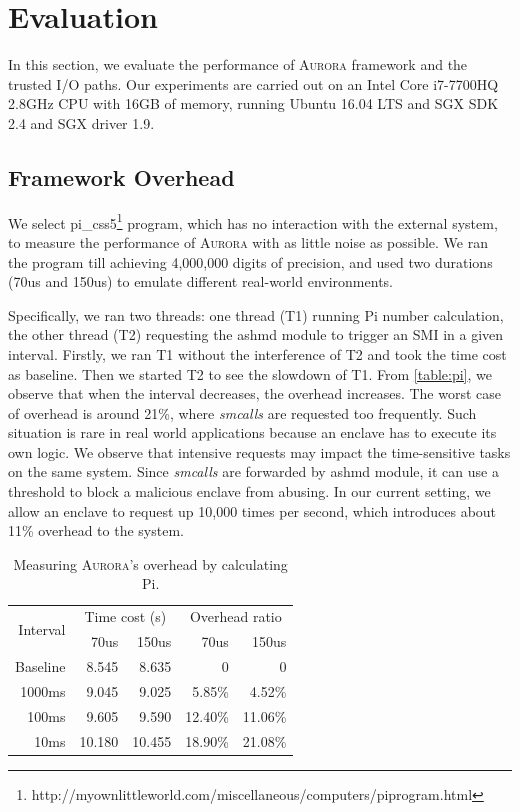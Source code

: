 \section{Evaluation}\label{performance}

In this section, we evaluate the performance of \textsc{Aurora} framework and the trusted I/O paths. Our experiments are carried out on  an Intel Core i7-7700HQ 2.8GHz CPU with 16GB of memory, running Ubuntu 16.04 LTS and SGX SDK 2.4 and SGX driver 1.9.

\subsection{Framework Overhead}
We select  pi\_css5\footnote{http://myownlittleworld.com/miscellaneous/computers/piprogram.html} program, which has no interaction with the external system, to measure the performance of \textsc{Aurora} with as little noise as possible. We ran the program till achieving 4,000,000 digits of precision, and used two durations (70us and 150us) to emulate different real-world environments.

Specifically, we ran two threads: one thread (T1) running Pi number calculation, the other thread (T2) requesting the ashmd module to trigger an SMI in a given interval. Firstly, we ran T1 without the interference of T2 and took the time cost as baseline. Then we started T2 to see the slowdown of T1. From \autoref{table:pi}, we observe that when the interval decreases, the overhead increases. The worst case of overhead is around 21\%, where \textit{smcalls} are requested too frequently. Such situation is rare in real world applications because an enclave has to execute its own logic. We observe that intensive requests may impact the time-sensitive tasks on the same system. Since \textit{smcalls} are forwarded by ashmd module, it can use a threshold to block a malicious enclave from abusing. In our current setting, we allow an enclave to request up 10,000 times per second, which introduces about 11\% overhead to the system.

\begin{table}[t]
	\centering
	\caption{Measuring \textsc{Aurora}'s overhead by calculating Pi.}
	\label{table:pi}
	\begin{tabular}{rrrrr}
		\toprule
		\multirow{2}{*}{Interval} & \multicolumn{2}{c}{Time cost (s)} & \multicolumn{2}{c}{Overhead ratio} \\\cmidrule{2-3}	 \cmidrule{4-5}
		& 70us & 150us & 70us & 150us \\
		\midrule
		Baseline & 8.545 & 8.635 & 0 & 0\\
		1000ms & 9.045 & 9.025 & 5.85\% & 4.52\%\\
		100ms & 9.605 & 9.590 & 12.40\% & 11.06\%\\
		10ms & 10.180 & 10.455 & 18.90\% & 21.08\%\\
		\bottomrule
	\end{tabular}
\end{table}

